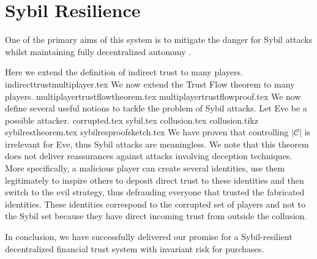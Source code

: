 \section{Sybil Resilience}
  One of the primary aims of this system is to mitigate the danger for Sybil attacks \cite{sybilattack} whilst maintaining
  fully decentralized autonomy \cite{dionyziz}.

  Here we extend the definition of indirect trust to many players.
  {indirecttrustmultiplayer.tex}
  \noindent We now extend the Trust Flow theorem to many players.
  {multiplayertrustflowtheorem.tex}
  {multiplayertrustflowproof.tex}
  \noindent We now define several useful notions to tackle the problem of Sybil attacks. Let Eve be a possible attacker.
  {corrupted.tex}
  {sybil.tex}
  {collusion.tex}
  {collusion.tikz}
  {sybilrestheorem.tex}
  {sybilresproofsketch.tex}
  We have proven that controlling $|\mathcal{C}|$ is irrelevant for Eve, thus Sybil attacks are meaningless. We note that
  this theorem does not deliver reassurances against attacks involving deception techniques. More specifically, a malicious
  player can create several identities, use them legitimately to inspire others to deposit direct trust to these identities
  and then switch to the evil strategy, thus defrauding everyone that trusted the fabricated identities. These identities
  correspond to the corrupted set of players and not to the Sybil set because they have direct incoming trust from outside
  the collusion.

  In conclusion, we have successfully delivered our promise for a Sybil-resilient decentralized financial trust system with
  invariant risk for purchases.

